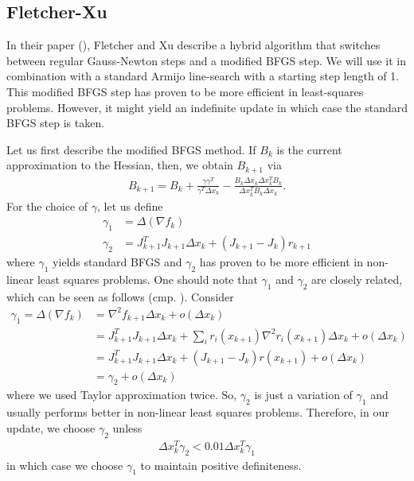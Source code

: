 \documentclass{article}
\theoremstyle{plain}%
\theoremstyle{definition}
\begin{document}
\subsection{Fletcher-Xu}
In their paper (\cite{Fletcher1987}), Fletcher and Xu describe a hybrid algorithm that switches
between regular Gauss-Newton steps and a modified BFGS step. We will use it in combination
with a standard Armijo line-search with a starting step length of 1. This modified BFGS step has
proven to be more efficient in least-squares problems. However, it might yield an indefinite update
in which case the standard BFGS step is taken. \par
Let us first describe the modified BFGS method. If $B_k$ is the current approximation to
the Hessian, then, we obtain $B_{k+1}$ via 
\begin{align*}
  B_{k+1}=B_k+\frac{\gamma \gamma^T}{\gamma^T \Delta x_k}-
\frac{B_k \Delta x_k \Delta x^T_kB_k}{\Delta x_k^T B_k \Delta x_k}.
\end{align*}
For the choice of $\gamma$, let us define 
\begin{align*}
  \gamma_1 &=\Delta\left( \nabla f_k\right) \\
  \gamma_2 &=J_{k+1}^T J_{k+1} \Delta x_k + (J_{k+1}-J_k)r_{k+1}
\end{align*}
where $\gamma_1$ yields standard BFGS and $\gamma_2$ has proven to be more
efficient in non-linear least squares problems. One should note that $\gamma_1$ and $\gamma_2$ are closely related, which
can be seen as follows (cmp. \cite{Becker2009}). Consider 
\begin{align*}
 \gamma_1= \Delta\left( \nabla f_{k}\right)&= \nabla^2 f_{k+1} \Delta x_k + o\left(\Delta x_k\right) \\
  & = J_{k+1}^T J_{k+1} \Delta x_k +\sum_{i} r_i(x_{k+1})\nabla^2 r_i(x_{k+1}) \Delta x_k+ o\left(\Delta x_k\right) \\
  & = J_{k+1}^T J_{k+1} \Delta x_k +(J_{k+1}-J_{k})r(x_{k+1})+ o\left(\Delta x_k\right)\\
& =\gamma_2 + o\left( \Delta x_k \right)
\end{align*}
where we used Taylor approximation twice. So, $\gamma_2$  is just a variation of $\gamma_1$
and usually performs better in non-linear least squares problems.
Therefore, in our update,
we choose $\gamma_2$ unless 
\begin{align*}
  \Delta x_k^T \gamma_2 < 0.01 \Delta x_k^T \gamma_1
\end{align*}
in which case we choose $\gamma_1$ to maintain positive definiteness. \par
\end{document}
